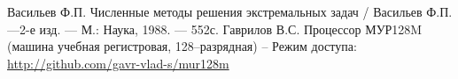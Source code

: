 \documentclass[14pt]{report}
\begin{document}
\renewcommand{\bibname}{Список литературы}
\begin{thebibliography}{99}
	 Васильев Ф.П. Численные методы решения экстремальных задач / Васильев Ф.П. ---2-е изд. --- М.: Наука, 1988. --- 552с.
	 Гаврилов В.С. Процессор МУР128M (машина учебная регистровая, 128--разрядная) -- Режим доступа: \url{http://github.com/gavr-vlad-s/mur128m}
\end{thebibliography}  
\end{document}
